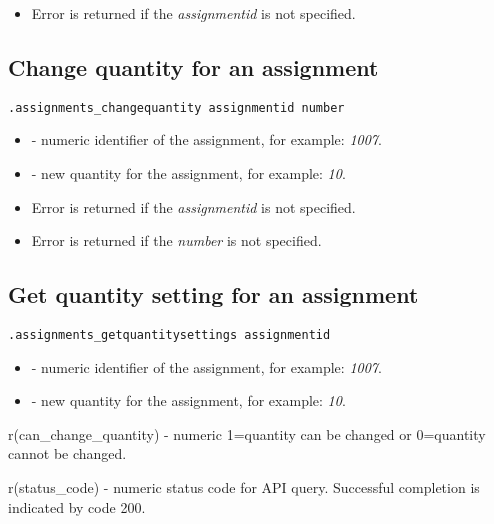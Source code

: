 \errheader
\begin{itemize}
    \item Error  is returned if the \textit{assignmentid} is not specified.
\end{itemize}



\subsection{Change quantity for an assignment}

\begin{lstlisting}[style=CommandLineStyle]
.assignments_changequantity assignmentid number
\end{lstlisting}

\paramsheader
\begin{itemize}
    \item {} - numeric identifier of the assignment, for example: \textit{1007}.
    \item {} - new quantity for the assignment, for example: \textit{10}.
\end{itemize}

\errheader
\begin{itemize}
    \item Error  is returned if the \textit{assignmentid} is not specified.
    \item Error  is returned if the \textit{number} is not specified.
\end{itemize}


\subsection{Get quantity setting for an assignment}

\begin{lstlisting}[style=CommandLineStyle]
.assignments_getquantitysettings assignmentid
\end{lstlisting}

\paramsheader
\begin{itemize}
    \item {} - numeric identifier of the assignment, for example: \textit{1007}.
    \item {} - new quantity for the assignment, for example: \textit{10}.
\end{itemize}

\savedres
\begin{compactitem}
    \item r(can\_change\_quantity) - numeric 1=quantity can be changed or 0=quantity cannot be changed.
    \item r(status\_code)  - numeric status code for API query. Successful completion is indicated by code 200.
\end{compactitem}

